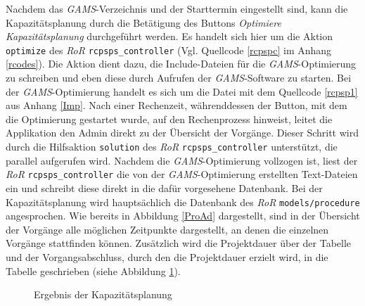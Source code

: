 \documentclass[a4paper,12pt,parskip,bibtotoc,liststotoc]{article}
\begin{document}
Nachdem das \textit{GAMS}-Verzeichnis und der Starttermin eingestellt sind, kann die Kapazitätsplanung durch die Betätigung des Buttons \textit{Optimiere Kapazitätsplanung} durchgeführt werden. Es handelt sich hier um die Aktion \texttt{optimize} des \textit{RoR} \texttt{rcpsps\_controller} (Vgl. Quellcode \ref{rcpspc} im Anhang \ref{rcodes}). Die Aktion dient dazu, die Include-Dateien für die \textit{GAMS}-Optimierung zu schreiben und eben diese durch Aufrufen der \textit{GAMS}-Software zu starten. Bei der \textit{GAMS}-Optimierung handelt es sich um die Datei mit dem Quellcode \ref{rcpsp1} aus Anhang \ref{Imp}. Nach einer Rechenzeit, währenddessen der Button, mit dem die Optimierung gestartet wurde, auf den Rechenprozess hinweist, leitet die Applikation den Admin direkt zu der Übersicht der Vorgänge. Dieser Schritt wird durch die Hilfsaktion \texttt{solution} des \textit{RoR} \texttt{rcpsps\_controller} unterstützt, die parallel aufgerufen wird. Nachdem die \textit{GAMS}-Optimierung vollzogen ist, liest der \textit{RoR} \texttt{rcpsps\_controller} die von der \textit{GAMS}-Optimierung erstellten Text-Dateien ein und schreibt diese direkt in die dafür vorgesehene Datenbank. Bei der Kapazitätsplanung wird hauptsächlich die Datenbank des \textit{RoR} \texttt{models/procedure} angesprochen. Wie bereits in Abbildung \ref{ProAd} dargestellt, sind in der Übersicht der Vorgänge alle möglichen Zeitpunkte dargestellt, an denen die einzelnen Vorgänge stattfinden können. Zusätzlich wird die Projektdauer über der Tabelle und der Vorgangsabschluss, durch den die Projektdauer erzielt wird, in die Tabelle geschrieben (siehe Abbildung \ref{Kap}).\\
\begin{figure}[h!]
  \begin{center}
    \caption{Ergebnis der Kapazitätsplanung}  \label{Kap}
  \end{center}
\end{figure}
\end{document}
